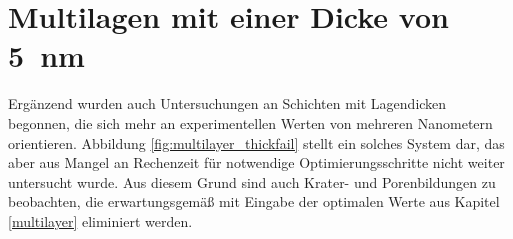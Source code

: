 \section{Multilagen mit einer Dicke von \SI{5}{\nano\meter}}

Ergänzend wurden auch Untersuchungen an Schichten mit Lagendicken begonnen, die sich mehr an experimentellen Werten von mehreren Nanometern orientieren.
Abbildung \ref{fig:multilayer_thickfail} stellt ein solches System dar, das aber aus Mangel an Rechenzeit für notwendige Optimierungsschritte nicht weiter untersucht wurde.
Aus diesem Grund sind auch Krater- und Porenbildungen zu beobachten, die erwartungsgemäß mit Eingabe der optimalen Werte aus Kapitel \ref{multilayer} eliminiert werden.
